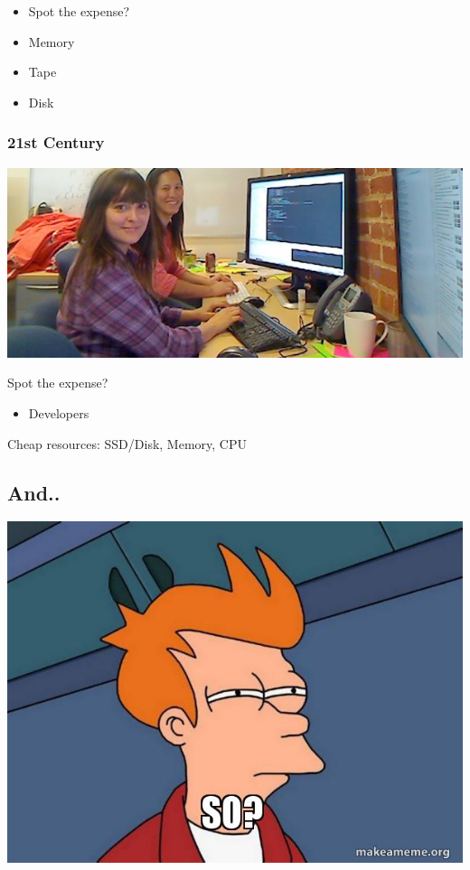 \documentclass[11pt]{article}
\begin{document}
\begin{itemize}
\item Spot the expense?
\end{itemize}
\begin{itemize}
\item Memory
\end{itemize}
\begin{itemize}
\item Tape
\end{itemize}
\begin{itemize}
\item Disk
\end{itemize}


\subsubsection*{21st Century}
\label{sec:orgheadline7}

\includegraphics[width=.9\linewidth]{./pair-programming.png}

Spot the expense?
\begin{itemize}
\item Developers
\end{itemize}
Cheap resources: SSD/Disk, Memory, CPU


\subsection*{And..}
\label{sec:orgheadline11}

\includegraphics[width=.9\linewidth]{./fry-so.jpg}
\end{document}
